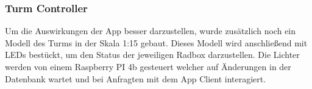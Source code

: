 ﻿\subsubsection{Turm Controller}

Um die Auswirkungen der App besser darzustellen, wurde zusätzlich noch ein Modell des Turms in der Skala 1:15 gebaut. Dieses Modell wird anschließend mit LEDs bestückt, um den Status der jeweiligen Radbox darzustellen. Die Lichter werden von einem Raspberry PI 4b gesteuert welcher auf Änderungen in der Datenbank wartet und bei Anfragten mit dem App Client interagiert.

